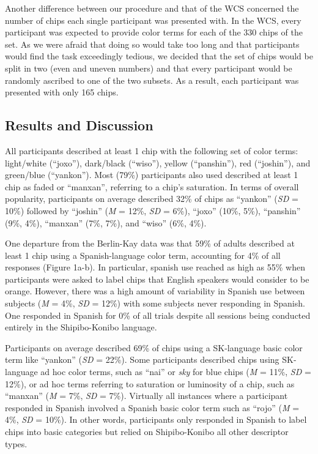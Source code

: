 \documentclass[man]{apa6}
\theoremstyle{definition}
\theoremstyle{definition}
\theoremstyle{definition}
\theoremstyle{remark}
\begin{document}
Another difference between our procedure and that of the WCS concerned
the number of chips each single participant was presented with. In the
WCS, every participant was expected to provide color terms for each of
the 330 chips of the set. As we were afraid that doing so would take too
long and that participants would find the task exceedingly tedious, we
decided that the set of chips would be split in two (even and uneven
numbers) and that every participant would be randomly ascribed to one of
the two subsets. As a result, each participant was presented with only
165 chips.

\subsection{Results and Discussion}\label{results-and-discussion}

All participants described at least 1 chip with the following set of
color terms: light/white (\enquote{joxo}), dark/black (\enquote{wiso}),
yellow (\enquote{panshin}), red (\enquote{joshin}), and green/blue
(\enquote{yankon}). Most (79\%) participants also used described at
least 1 chip as faded or \enquote{manxan}, referring to a chip's
saturation. In terms of overall popularity, participants on average
described 32\% of chips as \enquote{yankon} (\emph{SD} = 10\%) followed
by \enquote{joshin} (\emph{M} = 12\%, \emph{SD} = 6\%), \enquote{joxo}
(10\%, 5\%), \enquote{panshin} (9\%, 4\%), \enquote{manxan} (7\%, 7\%),
and \enquote{wiso} (6\%, 4\%).

One departure from the Berlin-Kay data was that 59\% of adults described
at least 1 chip using a Spanish-language color term, accounting for 4\%
of all responses (Figure 1a-b). In particular, spanish use reached as
high as 55\% when participants were asked to label chips that English
speakers would consider to be orange. However, there was a high amount
of variability in Spanish use between subjects (\emph{M} = 4\%,
\emph{SD} = 12\%) with some subjects never responding in Spanish. One
responded in Spanish for 0\% of all trials despite all sessions being
conducted entirely in the Shipibo-Konibo language.

Participants on average described 69\% of chips using a SK-language
basic color term like \enquote{yankon} (\emph{SD} = 22\%). Some
participants described chips using SK-language ad hoc color terms, such
as \enquote{nai} or \emph{sky} for blue chips (\emph{M} = 11\%,
\emph{SD} = 12\%), or ad hoc terms referring to saturation or luminosity
of a chip, such as \enquote{manxan} (\emph{M} = 7\%, \emph{SD} = 7\%).
Virtually all instances where a participant responded in Spanish
involved a Spanish basic color term such as \enquote{rojo} (\emph{M} =
4\%, \emph{SD} = 10\%). In other words, participants only responded in
Spanish to label chips into basic categories but relied on
Shipibo-Konibo all other descriptor types.
\end{document}
